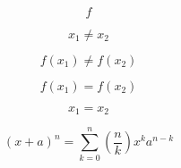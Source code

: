 \documentclass{article}
\begin{document}
$$f$$

$${x}_{1} \neq {x}_{2}$$

$$f({x}_{1}) \neq f({x}_{2}) $$

$$f({x}_{1}) = f({x}_{2})$$

$${x}_{1} = {x}_{2} $$

$$\left(x+a\right)^{n}=\sum_{k=0}^{n} \left(\frac{n}{k}\right){x}^{k}{a}^{n-k}$$
\end{document}
